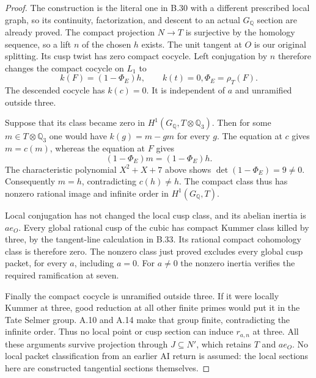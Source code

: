 \begin{proof}
The construction is the literal one in B.30 with a
different prescribed local graph, so its continuity,
factorization, and descent to an actual $G_{\mathbb Q}$
section are already proved.  The compact projection
$N\to T$ is surjective by the homology sequence, so a
lift $n$ of the chosen $h$ exists.
The unit tangent at $O$ is our original splitting.
Its cusp twist has zero compact cocycle.  Left
conjugation by $n$ therefore changes the compact
cocycle on $L_1$ to
\[
        k(F)=(1-\Phi_E)h,\qquad k(t)=0,
                    \Phi_E=\rho_T(F).                        \tag{B.34.2}
\]
The descended cocycle has $k(c)=0$.
It is independent of $a$ and unramified outside three.

Suppose that its class became zero in
$H^1(G_{\mathbb Q},T\otimes\mathbb Q_3)$.
Then for some $m\in T\otimes\mathbb Q_3$ one would have
$k(g)=m-gm$ for every $g$.
The equation at $c$ gives $m=c(m)$, whereas the equation
at $F$ gives
\[
                       (1-\Phi_E)m=(1-\Phi_E)h.
\]
The characteristic polynomial $X^2+X+7$ above shows
$\det(1-\Phi_E)=9\ne0$.
Consequently $m=h$, contradicting $c(h)\ne h$.
The compact class thus has nonzero rational image and
infinite order in $H^1(G_{\mathbb Q},T)$.

Local conjugation has not changed the local cusp
class, and its abelian inertia is $ae_O$.
Every global rational cusp of the cubic has compact
Kummer class killed by three, by the tangent-line
calculation in B.33.  Its rational compact cohomology
class is therefore zero.  The nonzero class just
proved excludes every global cusp packet, for every
$a$, including $a=0$.
For $a\ne0$ the nonzero inertia verifies the required
ramification at seven.

Finally the compact cocycle is unramified outside
three.  If it were locally Kummer at three, good
reduction at all other finite primes would put it
in the Tate Selmer group.  A.10 and A.14 make that
group finite, contradicting the infinite order.
Thus no local point or cusp section can induce
$r_{a,n}$ at three.
All these arguments survive projection through
$J\subseteq N'$, which retains $T$ and $ae_O$.
No local packet classification from an earlier AI
return is assumed: the local sections here are
constructed tangential sections themselves.
\end{proof}

